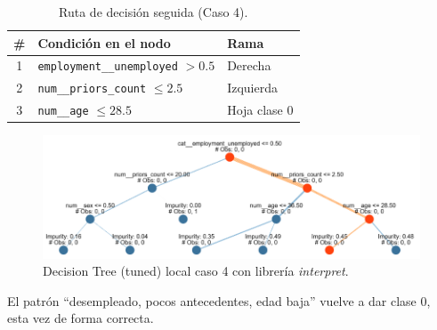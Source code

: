 \begin{table}[h!]
\centering
\caption{Ruta de decisión seguida (Caso 4).}
\label{tab:local-path-caso4}
\small
\begin{tabular}{@{}cll@{}}
\toprule
\# & \textbf{Condición en el nodo} & \textbf{Rama} \\
\midrule
1 & \texttt{employment\_\_unemployed} \(> 0.5\) & Derecha \\
2 & \texttt{num\_\_priors\_count} \(\le 2.5\)   & Izquierda \\
3 & \texttt{num\_\_age} \(\le 28.5\)            & Hoja clase 0 \\
\bottomrule
\end{tabular}
\end{table}

\begin{figure}[h!]
  \centering
  \includegraphics[width=0.92\linewidth]{figures/decision_tree_tunned_depth_local4.png}
  \caption{Decision Tree (tuned) local caso 4 con librería \textit{interpret}.}
  \label{fig:tree-tuned_local4}
\end{figure}

El patrón “desempleado, pocos antecedentes, edad baja” vuelve a dar clase 0, esta vez de forma correcta.

